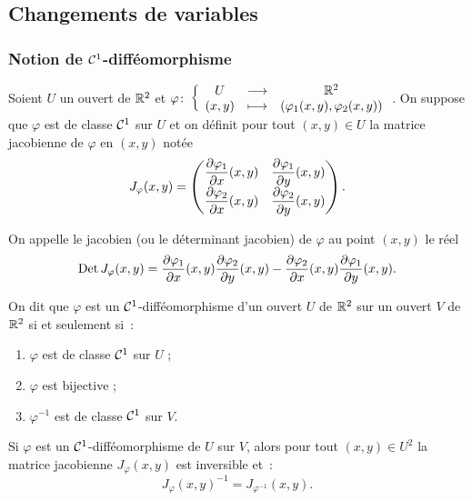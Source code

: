 \subsection{Changements de variables}

\subsubsection{Notion de $\mathcal{C}^{1}$-difféomorphisme}

\begin{defdef}
  Soient $U$ un ouvert de $\mathbb{R}^2$ et $\varphi\colon \left\{\begin{array}{ccc} U & \longrightarrow &\mathbb{R}^2\\ (x,y) & \longmapsto & (\varphi_1(x,y),\varphi_2(x,y)) \end{array} \right.$. On suppose que $\varphi$ est de classe $\mathcal{C}^{1}$ sur $U$ et on définit pour tout $(x,y) \in U$ la matrice jacobienne de $\varphi$ en $(x,y)$ notée
  \begin{equation}
    J_\varphi(x,y) = \begin{pmatrix} \dfrac{\partial{} \varphi_1}{\partial{} x}(x,y) & \dfrac{\partial{} \varphi_1}{\partial{} y}(x,y) \\ \dfrac{\partial{} \varphi_2}{\partial{} x}(x,y) & \dfrac{\partial{} \varphi_2}{\partial{} y}(x,y) \end{pmatrix}.
  \end{equation}

  On appelle le jacobien (ou le déterminant jacobien) de $\varphi$ au point $(x,y)$ le réel
  \begin{equation}
    \operatorname{Det} J_\varphi(x,y) = \dfrac{\partial{} \varphi_1}{\partial{} x}(x,y) \dfrac{\partial{} \varphi_2}{\partial{} y}(x,y) - \dfrac{\partial{} \varphi_2}{\partial{} x}(x,y) \dfrac{\partial{} \varphi_1}{\partial{} y}(x,y).
  \end{equation}
\end{defdef}
%
\begin{defdef}
  On dit que $\varphi$ est un $\mathcal{C}^{1}$-difféomorphisme d'un ouvert $U$ de $\mathbb{R}^2$ sur un ouvert $V$ de $\mathbb{R}^2$ si et seulement si~:
  \begin{enumerate}
  \item $\varphi$ est de classe $\mathcal{C}^{1}$ sur $U$ ;
  \item $\varphi$ est bijective ;
  \item $\varphi^{-1}$ est de classe $\mathcal{C}^{1}$ sur $V$.
  \end{enumerate}
\end{defdef}
%
\begin{prop}[Admise]
  Si $\varphi$ est un $\mathcal{C}^{1}$-difféomorphisme de $U$ sur $V$, alors pour tout $(x,y) \in U^2$ la matrice jacobienne $J_\varphi(x,y)$ est inversible et~:
  \begin{equation}
    J_\varphi(x,y)^{-1} = J_{\varphi^{-1}}(x,y).
  \end{equation}
\end{prop}

